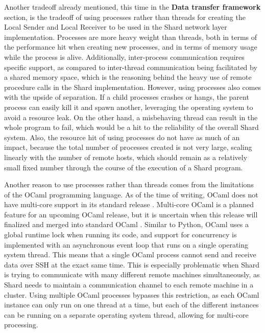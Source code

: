 \documentclass[twoside]{report}
\begin{document}
Another tradeoff already mentioned, this time in the \textbf{Data transfer framework} section, is the tradeoff of using processes rather than threads for creating the Local Sender and Local Receiver to be used in the Shard network layer implementation.
Processes are more heavy weight than threads, both in terms of the performance hit when creating new processes, and in terms of memory usage while the process is alive.
Additionally, inter-process communication requires specific support, as compared to inter-thread communication being facilitated by a shared memory space, which is the reasoning behind the heavy use of remote procedure calls in the Shard implementation.
However, using processes also comes with the upside of separation.
If a child processes crashes or hangs, the parent process can easily kill it and spawn another, leveraging the operating system to avoid a resource leak.
On the other hand, a misbehaving thread can result in the whole program to fail, which would be a hit to the reliability of the overall Shard system.
Also, the resource hit of using processes do not have as much of an impact, because the total number of processes created is not very large, scaling linearly with the number of remote hosts, which should remain as a relatively small fixed number through the course of the execution of a Shard program.

Another reason to use processes rather than threads comes from the limitations of the OCaml programming language.
As of the time of writing, OCaml does not have multi-core support in its standard release
\cite{dolan2014multicore}.
Multi-core OCaml is a planned feature for an upcoming OCaml release, but it is uncertain when this release will finalized and merged into standard OCaml \cite{sivaramakrishnan2020retrofitting}.
Similar to Python, OCaml uses a global runtime lock when running its code, and support for concurrency is implemented with an asynchronous event loop that runs on a single operating system thread.
This means that a single OCaml process cannot send and receive data over SSH at the exact same time.
This is especially problematic when Shard is trying to communicate with many different remote machines simultaneously, as Shard needs to maintain a communication channel to each remote machine in a cluster.
Using multiple OCaml processes bypasses this restriction, as each OCaml instance can only run on one thread at a time, but each of the different instances can be running on a separate operating system thread, allowing for multi-core processing.
\end{document}
